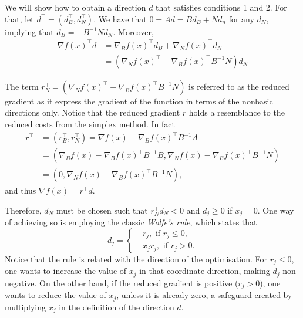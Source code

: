 We will show how to obtain a direction $d$ that satisfies conditions 1 and 2. For that, let $d^\top = (d_B^\top, d_N^\top)$. We have that $0 = Ad = Bd_B + Nd_n$ for any $d_N$, implying that $d_B = -B^{-1}Nd_N$. Moreover,
\begin{align}
	\nabla f(x)^\top d & = \nabla_B f(x)^\top d_B + \nabla_N f(x)^\top d_N \nonumber\\
	& = (\nabla_N f(x)^\top - \nabla_Bf(x)^\top B^{-1}N)d_N \label{eq:red_grad}
\end{align}

The term $r_N^\top = (\nabla_N f(x)^\top - \nabla_Bf(x)^\top B^{-1}N)$ is referred to as the reduced gradient as it express the gradient of the function in terms of the nonbasic directions only. Notice that the reduced gradient $r$ holds a resemblance to the reduced costs from the simplex method. In fact
%
\begin{align*}
	r^\top & =  (r_B^\top, r_N^\top) = \nabla f(x) - \nabla_Bf(x)^\top B^{-1}A \\ 
 	& =  (\nabla_B f(x) - \nabla_B f(x)^\top B^{-1}B, \nabla_N f(x) - \nabla_B f(x)^\top B^{-1}N) \\
 	& = (0, \nabla_N f(x) - \nabla_B f(x)^\top B^{-1}N),
\end{align*}
%
and thus $\nabla f(x) = r^\top d$.

Therefore, $d_N$ must be chosen such that $r_N^\top d_N < 0$ and $d_j \geq 0$ if $x_j = 0$. One way of achieving so is employing the classic \emph{Wolfe's rule}, which states that
$$d_j = \begin{cases} -r_j, \text{ if } r_j \leq 0, \\
                      -x_jr_j, \text{ if } r_j > 0.
        \end{cases}
$$ 
Notice that the rule is related with the direction of the optimisation. For $r_j \leq 0$, one wants to increase the value of $x_j$ in that coordinate direction, making $d_j$ non-negative. On the other hand, if the reduced gradient is positive ($r_j > 0$), one wants to reduce the value of $x_j$, unless it is already zero, a safeguard created by multiplying $x_j$ in the definition of the direction $d$.

